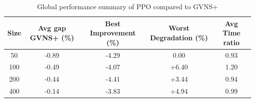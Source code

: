 \begin{table}[ht]
\centering
\footnotesize
\setlength{\tabcolsep}{4pt}
\caption{Global performance summary of PPO compared to GVNS+}
\vspace{3mm}
\begin{tabular}{c c c c c}
\toprule
\textbf{Size} & \textbf{Avg gap GVNS+ (\%)} & \textbf{Best Improvement (\%)} & \textbf{Worst Degradation (\%)} & \textbf{Avg Time ratio} \\
\midrule
50  & -0.89 & -4.29 & 0.00 & 0.93 \\
100 & -0.49 & -4.07 & +6.40 & 1.20 \\
200 & -0.44 & -4.41 & +3.44 & 0.94 \\
400 & -0.14 & -3.83 & +4.94 & 0.99 \\
\bottomrule
\end{tabular}
\label{tab:ppo_summary}
\end{table}